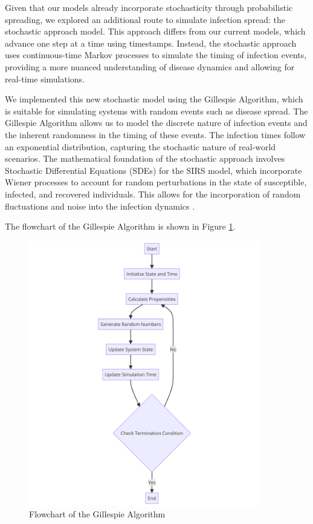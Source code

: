 Given that our models already incorporate stochasticity through probabilistic spreading, we explored an additional route to simulate infection spread: the stochastic approach model. This approach differs from our current models, which advance one step at a time using timestamps. Instead, the stochastic approach uses continuous-time Markov processes to simulate the timing of infection events, providing a more nuanced understanding of disease dynamics and allowing for real-time simulations.

We implemented this new stochastic model using the Gillespie Algorithm, which is suitable for simulating systems with random events such as disease spread. The Gillespie Algorithm allows us to model the discrete nature of infection events and the inherent randomness in the timing of these events. The infection times follow an exponential distribution, capturing the stochastic nature of real-world scenarios. The mathematical foundation of the stochastic approach involves Stochastic Differential Equations (SDEs) for the SIRS model, which incorporate Wiener processes to account for random perturbations in the state of susceptible, infected, and recovered individuals. This allows for the incorporation of random fluctuations and noise into the infection dynamics \cite{liu2020, paladini2011, rodriguez2020}.

The flowchart of the Gillespie Algorithm is shown in Figure \ref{fig:gillespie_algorithm}.

\begin{figure}[H]
    \centering
    \includegraphics[width=0.9\textwidth]{flowchart_algorithm.png}
    \caption{Flowchart of the Gillespie Algorithm}
    \label{fig:gillespie_algorithm}
\end{figure}

